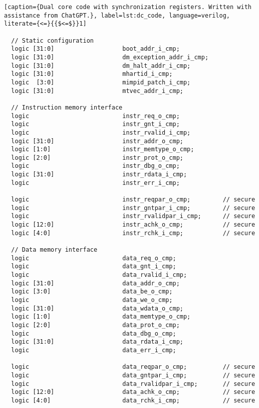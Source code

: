 \begin{lstlisting}[caption={Dual core code with synchronization registers. Written with assistance from ChatGPT.}, label=lst:dc_code, language=verilog, literate={<=}{{$<=$}}1]                                                                                    

  // Static configuration
  logic [31:0]                   boot_addr_i_cmp;
  logic [31:0]                   dm_exception_addr_i_cmp;
  logic [31:0]                   dm_halt_addr_i_cmp;
  logic [31:0]                   mhartid_i_cmp;
  logic  [3:0]                   mimpid_patch_i_cmp;
  logic [31:0]                   mtvec_addr_i_cmp;

  // Instruction memory interface
  logic                          instr_req_o_cmp;
  logic                          instr_gnt_i_cmp;
  logic                          instr_rvalid_i_cmp;
  logic [31:0]                   instr_addr_o_cmp;
  logic [1:0]                    instr_memtype_o_cmp;
  logic [2:0]                    instr_prot_o_cmp;
  logic                          instr_dbg_o_cmp;
  logic [31:0]                   instr_rdata_i_cmp;
  logic                          instr_err_i_cmp;

  logic                          instr_reqpar_o_cmp;         // secure
  logic                          instr_gntpar_i_cmp;         // secure
  logic                          instr_rvalidpar_i_cmp;      // secure
  logic [12:0]                   instr_achk_o_cmp;           // secure
  logic [4:0]                    instr_rchk_i_cmp;           // secure

  // Data memory interface
  logic                          data_req_o_cmp;
  logic                          data_gnt_i_cmp;
  logic                          data_rvalid_i_cmp;
  logic [31:0]                   data_addr_o_cmp;
  logic [3:0]                    data_be_o_cmp;
  logic                          data_we_o_cmp;
  logic [31:0]                   data_wdata_o_cmp;
  logic [1:0]                    data_memtype_o_cmp;
  logic [2:0]                    data_prot_o_cmp;
  logic                          data_dbg_o_cmp;
  logic [31:0]                   data_rdata_i_cmp;
  logic                          data_err_i_cmp;

  logic                          data_reqpar_o_cmp;          // secure
  logic                          data_gntpar_i_cmp;          // secure
  logic                          data_rvalidpar_i_cmp;       // secure
  logic [12:0]                   data_achk_o_cmp;            // secure
  logic [4:0]                    data_rchk_i_cmp;            // secure


\end{lstlisting}
